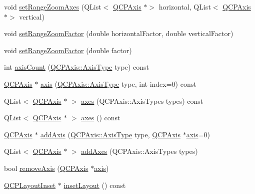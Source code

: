 \begin{DoxyCompactItemize}
\item 
void \hyperlink{classQCPAxisRect_ae85a63a856e111def77437812c3acc99}{set\+Range\+Zoom\+Axes} (Q\+List$<$ \hyperlink{classQCPAxis}{Q\+C\+P\+Axis} $\ast$$>$ horizontal, Q\+List$<$ \hyperlink{classQCPAxis}{Q\+C\+P\+Axis} $\ast$$>$ vertical)
\item 
void \hyperlink{classQCPAxisRect_a895d7ac745ea614e04056244b3c138ac}{set\+Range\+Zoom\+Factor} (double horizontal\+Factor, double vertical\+Factor)
\item 
void \hyperlink{classQCPAxisRect_ae83d187b03fc6fa4f00765ad50cd3fc3}{set\+Range\+Zoom\+Factor} (double factor)
\item 
int \hyperlink{classQCPAxisRect_a85b321acec0f694d8b5fdeafdbff3133}{axis\+Count} (\hyperlink{classQCPAxis_ae2bcc1728b382f10f064612b368bc18a}{Q\+C\+P\+Axis\+::\+Axis\+Type} type) const
\item 
\hyperlink{classQCPAxis}{Q\+C\+P\+Axis} $\ast$ \hyperlink{classQCPAxisRect_a583ae4f6d78b601b732183f6cabecbe1}{axis} (\hyperlink{classQCPAxis_ae2bcc1728b382f10f064612b368bc18a}{Q\+C\+P\+Axis\+::\+Axis\+Type} type, int index=0) const
\item 
Q\+List$<$ \hyperlink{classQCPAxis}{Q\+C\+P\+Axis} $\ast$ $>$ \hyperlink{classQCPAxisRect_a8db4722cb93e9c4a6f0d91150c200867}{axes} (Q\+C\+P\+Axis\+::\+Axis\+Types types) const
\item 
Q\+List$<$ \hyperlink{classQCPAxis}{Q\+C\+P\+Axis} $\ast$ $>$ \hyperlink{classQCPAxisRect_a11657b8faebe9677180860e8057ede26}{axes} () const
\item 
\hyperlink{classQCPAxis}{Q\+C\+P\+Axis} $\ast$ \hyperlink{classQCPAxisRect_a2dc336092ccc57d44a46194c8a23e4f4}{add\+Axis} (\hyperlink{classQCPAxis_ae2bcc1728b382f10f064612b368bc18a}{Q\+C\+P\+Axis\+::\+Axis\+Type} type, \hyperlink{classQCPAxis}{Q\+C\+P\+Axis} $\ast$\hyperlink{classQCPAxisRect_a583ae4f6d78b601b732183f6cabecbe1}{axis}=0)
\item 
Q\+List$<$ \hyperlink{classQCPAxis}{Q\+C\+P\+Axis} $\ast$ $>$ \hyperlink{classQCPAxisRect_a792e1f3d9cb1591fca135bb0de9b81fc}{add\+Axes} (Q\+C\+P\+Axis\+::\+Axis\+Types types)
\item 
bool \hyperlink{classQCPAxisRect_a03c39cd9704f0d36fb6cf980cdddcbaa}{remove\+Axis} (\hyperlink{classQCPAxis}{Q\+C\+P\+Axis} $\ast$\hyperlink{classQCPAxisRect_a583ae4f6d78b601b732183f6cabecbe1}{axis})
\item 
\hyperlink{classQCPLayoutInset}{Q\+C\+P\+Layout\+Inset} $\ast$ \hyperlink{classQCPAxisRect_a949f803466619924c7018df4b511ae10}{inset\+Layout} () const

\end{DoxyCompactItemize}
